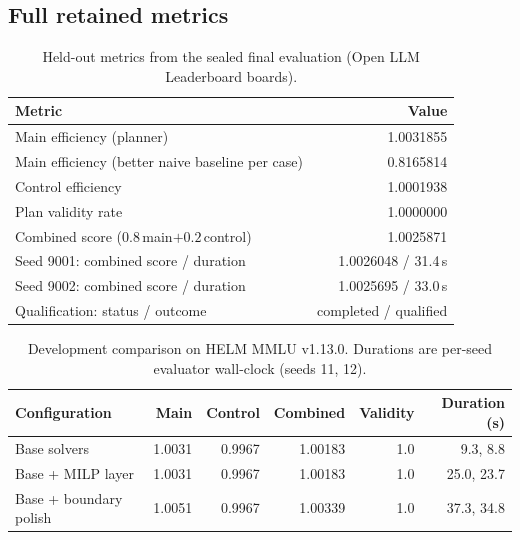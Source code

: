 \documentclass{article}
\begin{document}
\subsection{Full retained metrics}
\begin{table}[h]
\centering
\caption{Held-out metrics from the sealed final evaluation (Open LLM Leaderboard boards).}
\label{tab:final}
\small
\begin{tabular}{@{}lr@{}}
\toprule
Metric & Value\\
\midrule
Main efficiency (planner) & 1.0031855 \\ %
Main efficiency (better naive baseline per case) & 0.8165814 \\ %
Control efficiency & 1.0001938 \\ %
Plan validity rate & 1.0000000 \\ %
Combined score ($0.8\,$main$+0.2\,$control) & 1.0025871 \\ %
Seed 9001: combined score / duration & 1.0026048 / 31.4\,s \\ %
Seed 9002: combined score / duration & 1.0025695 / 33.0\,s \\ %
Qualification: status / outcome & completed / qualified \\ %
\bottomrule
\end{tabular}
\end{table}

\begin{table}[h]
\centering
\caption{Development comparison on HELM MMLU v1.13.0. Durations are per-seed evaluator wall-clock (seeds 11, 12).} %
\label{tab:search}
\small
\begin{tabular}{@{}lrrrrr@{}}
\toprule
Configuration & Main & Control & Combined & Validity & Duration (s)\\
\midrule
Base solvers & 1.0031 & 0.9967 & 1.00183 & 1.0 & 9.3, 8.8\\ %
Base + MILP layer & 1.0031 & 0.9967 & 1.00183 & 1.0 & 25.0, 23.7\\ %
Base + boundary polish & 1.0051 & 0.9967 & 1.00339 & 1.0 & 37.3, 34.8\\ %
\bottomrule
\end{tabular}
\end{table}
\end{document}
